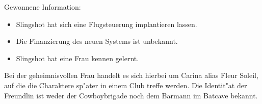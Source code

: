 \begin{remarks}
	Gewonnene Information: 

	\begin{itemize}
		\item Slingshot hat sich eine Flugsteuerung implantieren lassen.
		\item Die Finanzierung des neuen Systems ist unbekannt.
		\item Slingshot hat eine Frau kennen gelernt.
	\end{itemize}
	
	Bei der geheimnisvollen Frau handelt es sich hierbei um Carina alias Fleur Soleil, auf die die Charaktere sp"ater in einem Club treffe werden. Die Identit"at der Freundlin ist weder der Cowboybrigade noch dem Barmann im Batcave bekannt.
\end{remarks}

